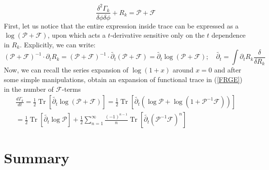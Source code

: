 \documentclass[11pt, a4paper]{article}
\begin{document}
\begin{equation}
    \frac{\delta^2 \Gamma_k}{\delta \phi \delta \phi} + R_k = \mathcal{P} + \mathcal{F}
\end{equation}
First, let us notice that the entire expression inside trace can be expressed as a $\log{(\mathcal{P}+\mathcal{F})}$, upon which acts
a $t$-derivative sensitive only on the $t$ dependence in $R_k$. Explicitly, we can write:
\begin{equation}
    \left(\mathcal{P} + \mathcal{F}\right)^{-1} \cdot \partial_t R_k = \left(\mathcal{P} + \mathcal{F}\right)^{-1} \cdot \widetilde{\partial_t} \left(\mathcal{P}+\mathcal{F}\right) = \widetilde{\partial_t} \log{\left(\mathcal{P}+\mathcal{F}\right)}; \quad \widetilde{\partial_t} = \int \partial_t R_k \frac{\delta}{\delta R_k}
\end{equation}
Now, we can recall the series expansion of $\log{(1+x)}$ around $x=0$ and after some simple manipulations, obtain an expansion of functional trace in (\ref{FRGE}) in
the number of $\mathcal{F}$-terms
\begin{gather}
    \frac{d \Gamma_k}{dt} = \frac{1}{2} \operatorname{Tr} \left[ \widetilde{\partial_t} \log{\left(\mathcal{P}+\mathcal{F}\right)} \right] = \frac{1}{2} \operatorname{Tr} \left[ \widetilde{\partial_t} \left(\log{\mathcal{P}} + \log{(1+\mathcal{P}^{-1}\mathcal{F})}\right) \right] \\ =  \frac{1}{2} \operatorname{Tr} \left[ \widetilde{\partial_t} \log{\mathcal{P}} \right] + \frac{1}{2} \sum_{n=1}^{\infty} \frac{(-1)^{n-1}}{n} \operatorname{Tr}\left[\widetilde{\partial_t}\left(\mathcal{P}^{-1}\mathcal{F}\right)^n\right]
\end{gather}

\section*{Summary}
\end{document}
